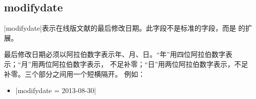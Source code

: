 

\subsection{modifydate}\label{subsec:bibfield-modifydate}

|modifydate|表示在线版文献的最后修改日期。此字段不是标准的{\BibTeX}字段，而是{\njuthesis}
的扩展。

最后修改日期必须以阿拉伯数字表示年、月、日。“年”用四位阿拉伯数字表示；“月”用两位阿拉伯数字表示，
不足补零；“日”用两位阿拉伯数字表示，不足补零。三个部分之间用一个短横隔开。
例如：
\begin{itemize}
\item |modifydate = {2013-08-30}|
\end{itemize}

